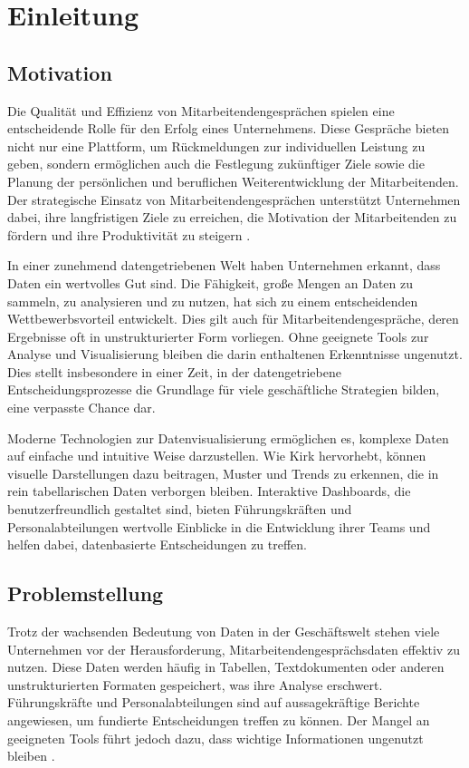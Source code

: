 \chapter{Einleitung}
\label{chap:einleitung}

\section{Motivation}
Die Qualität und Effizienz von Mitarbeitendengesprächen spielen eine entscheidende Rolle für den Erfolg eines Unternehmens. Diese Gespräche bieten nicht nur eine Plattform, um Rückmeldungen zur individuellen Leistung zu geben, sondern ermöglichen auch die Festlegung zukünftiger Ziele sowie die Planung der persönlichen und beruflichen Weiterentwicklung der Mitarbeitenden. Der strategische Einsatz von Mitarbeitendengesprächen unterstützt Unternehmen dabei, ihre langfristigen Ziele zu erreichen, die Motivation der Mitarbeitenden zu fördern und ihre Produktivität zu steigern \cite{schober2008}.

In einer zunehmend datengetriebenen Welt haben Unternehmen erkannt, dass Daten ein wertvolles Gut sind. Die Fähigkeit, große Mengen an Daten zu sammeln, zu analysieren und zu nutzen, hat sich zu einem entscheidenden Wettbewerbsvorteil entwickelt. Dies gilt auch für Mitarbeitendengespräche, deren Ergebnisse oft in unstrukturierter Form vorliegen. Ohne geeignete Tools zur Analyse und Visualisierung bleiben die darin enthaltenen Erkenntnisse ungenutzt. Dies stellt insbesondere in einer Zeit, in der datengetriebene Entscheidungsprozesse die Grundlage für viele geschäftliche Strategien bilden, eine verpasste Chance dar.

Moderne Technologien zur Datenvisualisierung ermöglichen es, komplexe Daten auf einfache und intuitive Weise darzustellen. Wie Kirk \cite{kirk2016data} hervorhebt, können visuelle Darstellungen dazu beitragen, Muster und Trends zu erkennen, die in rein tabellarischen Daten verborgen bleiben. Interaktive Dashboards, die benutzerfreundlich gestaltet sind, bieten Führungskräften und Personalabteilungen wertvolle Einblicke in die Entwicklung ihrer Teams und helfen dabei, datenbasierte Entscheidungen zu treffen.

\section{Problemstellung}
Trotz der wachsenden Bedeutung von Daten in der Geschäftswelt stehen viele Unternehmen vor der Herausforderung, Mitarbeitendengesprächsdaten effektiv zu nutzen. Diese Daten werden häufig in Tabellen, Textdokumenten oder anderen unstrukturierten Formaten gespeichert, was ihre Analyse erschwert. Führungskräfte und Personalabteilungen sind auf aussagekräftige Berichte angewiesen, um fundierte Entscheidungen treffen zu können. Der Mangel an geeigneten Tools führt jedoch dazu, dass wichtige Informationen ungenutzt bleiben \cite{duarte2012performance}.

